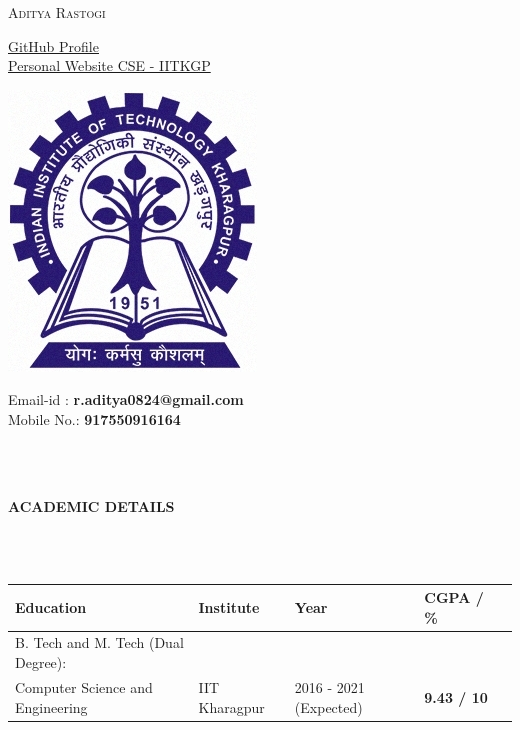 \documentclass[a4,10pt]{book}
\newcommand{\lsep}{-0.57cm}
\newcommand{\resheading}[1]{{\small \colorbox{mygrey}{\begin{minipage}{0.975\textwidth}{\textbf{#1 \vphantom{p\^{E}}}}\end{minipage}}}}
\begin{document}
\begin{center}
\textsc{\huge Aditya Rastogi}
\end{center}

\begin{minipage}{0.30\textwidth}
{\raggedleft
\href{https://github.com/thunderInfy/}{GitHub Profile} \\
\href{http://cse.iitkgp.ac.in/~arastogi}{Personal Website CSE - IITKGP}\\
}
\end{minipage}%
\begin{minipage}{0.33\textwidth}
\begin{center}
	\includegraphics[scale=0.1]{logo.jpg}
\end{center}
\end{minipage}%
\begin{minipage}{0.33\textwidth}
{\raggedright
Email-id : \textbf{r.aditya0824@gmail.com} \\
Mobile No.: \textbf{917550916164} \\
}
\end{minipage}%
\hspace{0.5cm}\\
\\
\resheading{\textbf{ACADEMIC DETAILS} }\\[\lsep]
\\
\begin{center}
\renewcommand{\arraystretch}{1.5}
\indent \begin{tabular}{ |@{\hskip 0.125in}l @{\hskip 0.125in} |@{\hskip 0.125in}l @{\hskip 0.125in} |@{\hskip 0.125in}l @{\hskip 0.125in} |@{\hskip 0.125in}l @{\hskip 0.25in} |l }
\hline
\textbf{Education} & \textbf{Institute} & \textbf{Year} & \textbf{CGPA / \%} \\
\hline
B. Tech and M. Tech (Dual Degree): &&&\\[-0.5em]
{Computer Science and Engineering} & IIT Kharagpur  & 2016 - 2021 (Expected) & \textbf{9.43 / 10} \\
\hline
\end{tabular}
\end{center}
\end{document}
